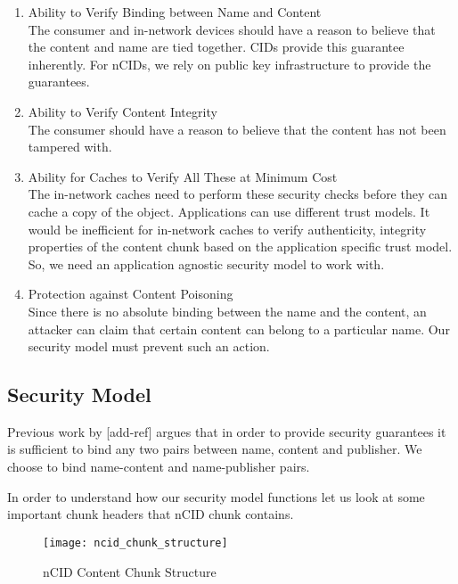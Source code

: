 \begin{enumerate}
\item{Ability to Verify Binding between Name and Content} \\
The consumer and in-network devices should have a reason to believe
that the content and name are tied together. CIDs provide this
guarantee inherently. For nCIDs, we rely on public key infrastructure
to provide the guarantees.
\item{Ability to Verify Content Integrity} \\
The consumer should have a reason to believe that the content has not
been tampered with.
\item{Ability for Caches to Verify All These at Minimum Cost}\\
The in-network caches need to perform these security checks before
they can cache a copy of the object. Applications can use different
trust models. It would be inefficient for in-network caches to verify
authenticity, integrity properties of the content chunk based on the
application specific trust model. So, we need an application agnostic
security model to work with.
\item{Protection against Content Poisoning} \\
Since there is no absolute binding between the name and the content,
an attacker can claim that certain content can belong to a particular
name. Our security model must prevent such an action.
\end{enumerate}
\subsection{Security Model}

Previous work by [add-ref] argues that in order to provide security
guarantees it is sufficient to bind any two pairs between name,
content and publisher. We choose to bind name-content and
name-publisher pairs.

In order to understand how our security model functions let us look at
some important chunk headers that nCID chunk contains.

\begin{figure}
  \begin{center}
    \texttt{[image: ncid\_chunk\_structure]}
    \caption{nCID Content Chunk Structure}
    \label{fig:ncid_chunk_structure}
  \end{center}
\end{figure}

